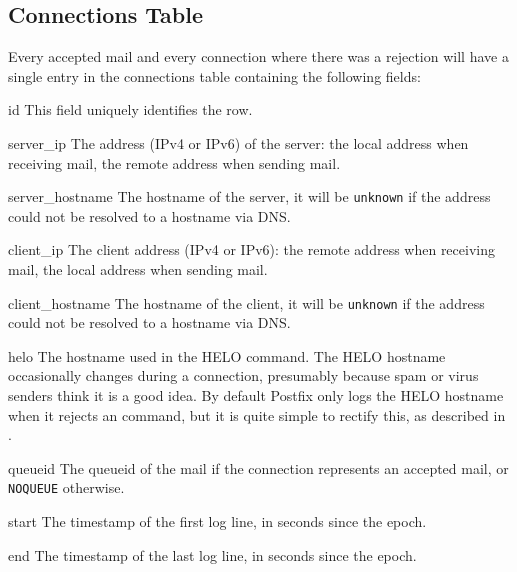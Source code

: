 \subsection{Connections Table}

\label{connections table}

Every accepted mail and every connection where there was a rejection will
have a single entry in the connections table containing the following
fields:

\begin{boldeqlist}

    \item [id] This field uniquely identifies the row.

    \item [server\_ip] The  address (IPv4 or IPv6) of the
        server: the local address when receiving mail, the remote address
        when sending mail.

    \item [server\_hostname] The hostname of the server, it will be
        \texttt{unknown} if the  address could not be resolved
        to a hostname via DNS\@.

    \item [client\_ip] The client  address (IPv4 or IPv6): the
        remote address when receiving mail, the local address when sending
        mail.

    \item [client\_hostname] The hostname of the client, it will be
        \texttt{unknown} if the  address could not be resolved
        to a hostname via DNS\@.

    \item [helo] The hostname used in the HELO command.  The HELO hostname
        occasionally changes during a connection, presumably because spam
        or virus senders think it is a good idea.  By default Postfix only
        logs the HELO hostname when it rejects an  command,
        but it is quite simple to rectify this, as described in
        .

    \item [queueid] The queueid of the mail if the connection represents an
        accepted mail, or \texttt{NOQUEUE} otherwise.

    \item [start] The timestamp of the first log line, in seconds since the
        epoch.

    \item [end] The timestamp of the last log line, in seconds since the
        epoch.

\end{boldeqlist}

